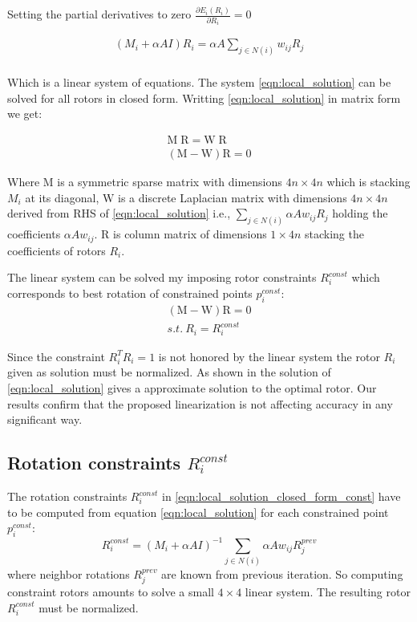 \documentclass{birkjour}
\numberwithin{equation}{section}
\begin{document}
Setting the partial derivatives to zero $\frac{\partial E_i(R_i)}{\partial R_i}  = 0$

\begin{eqnarray}
	\label{eqn:local_solution}
	(M_i + \alpha A I)R_i  = \alpha A \sum_{j \in N(i)} {w_{ij} R_j }\\
\end{eqnarray}

Which is a linear system of equations. The system \ref{eqn:local_solution} can be solved for all rotors in closed form. Writting \ref{eqn:local_solution} in matrix form we get:

\begin{eqnarray}
	\label{eqn:local_solution_closed_form}
	\mathrm M \; \mathrm R = \mathrm W \; \mathrm R\\
	(\mathrm M - \mathrm W) \mathrm R = \mathrm 0
\end{eqnarray}

Where $\mathrm M$ is a symmetric sparse  matrix  with dimensions $4n\times 4n$ which is stacking $M_i$ at its diagonal, $\mathrm W$ is a discrete Laplacian matrix with dimensions $4n\times 4n$ derived from RHS of \ref{eqn:local_solution} i.e., $\sum_{j \in N(i)} {\alpha A w_{ij} R_j }$ holding the coefficients $\alpha A w_{ij}$. $\mathrm R$ is column matrix of dimensions $1\times 4n$ stacking the coefficients of rotors $R_i$.

The linear system can be solved my imposing rotor constraints $R^{const}_i$ which corresponds to best rotation of constrained points $p^{const}_i$:
\begin{eqnarray}
	\label{eqn:local_solution_closed_form_const}
	(\mathrm M - \mathrm W) \mathrm R = \mathrm 0\\
	s.t. \ R_i = R^{const}_i \nonumber
\end{eqnarray}

Since the constraint $R_i^T R_i = 1$ is not honored by the linear system the rotor $R_i$ given as solution must be normalized. As shown in \cite{Ligare2020} the solution of \ref{eqn:local_solution} gives a approximate solution to the optimal rotor. Our results confirm that the proposed linearization is not affecting accuracy in any significant way.

\subsection{Rotation constraints $R^{const}_i$}

The rotation constraints $R^{const}_i$ in \ref{eqn:local_solution_closed_form_const} have to be computed from equation \ref{eqn:local_solution} for each constrained point $p^{const}_i$:
\begin{equation}
	R^{const}_i  = (M_i + \alpha A I)^{-1}  \sum_{j \in N(i)} {\alpha A w_{ij} R^{prev}_j } \nonumber
\end{equation}
where neighbor rotations $R^{prev}_j$ are known from previous iteration. So computing constraint rotors amounts to solve a small $4\times4$ linear system. The resulting rotor $R^{const}_i$ must be normalized.
\end{document}
